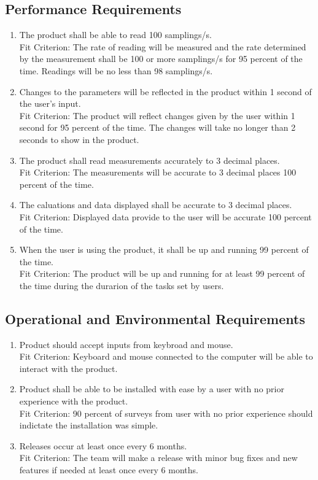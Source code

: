 \documentclass[12pt, titlepage]{article}
\begin{document}
\subsection{Performance Requirements}
\begin{adjustwidth}{2.2em}{0pt}
\begin{enumerate}[{NFR-P}1.]
  \item The product shall be able to read 100 samplings/s.\\
  Fit Criterion: The rate of reading will be measured and the rate determined by the measurement shall be 100 or more samplings/s for 95 percent of the time. 
  Readings will be no less than 98 samplings/s.
  \item Changes to the parameters will be reflected in the product within 1 second of the user's input.\\
  Fit Criterion: The product will reflect changes given by the user within 1 second for 95 percent of the time. 
  The changes will take no longer than 2 seconds to show in the product.
  \item The product shall read measurements accurately to 3 decimal places.\\
  Fit Criterion: The measurements will be accurate to 3 decimal places 100 percent of the time.
  \item The caluations and data displayed shall be accurate to 3 decimal places.\\
  Fit Criterion: Displayed data provide to the user will be accurate 100 percent of the time.
  \item When the user is using the product, it shall be up and running 99 percent of the time.\\
  Fit Criterion: The product will be up and running for at least 99 percent of the time during the durarion of the tasks set by users.
\end{enumerate}
\end{adjustwidth}

\subsection{Operational and Environmental Requirements}
\begin{adjustwidth}{2.2em}{0pt}
\begin{enumerate}[{NFR-O}1.]
  \item Product should accept inputs from keybroad and mouse.\\
  Fit Criterion: Keyboard and mouse connected to the computer will be able to interact with the product.
  \item Product shall be able to be installed with ease by a user with no prior experience with the product.\\
  Fit Criterion: 90 percent of surveys from user with no prior experience should indictate the installation was simple.
  \item Releases occur at least once every 6 months.\\
  Fit Criterion: The team will make a release with minor bug fixes and new features if needed at least once every 6 months.
\end{enumerate}
\end{adjustwidth}
\end{document}
